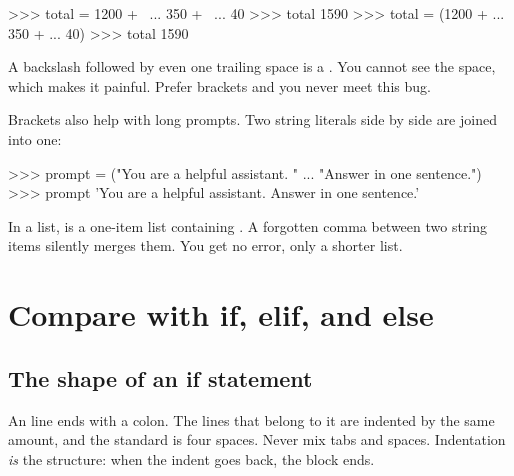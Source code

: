 \begin{pycode}
>>> total = 1200 + \
...         350 + \
...         40
>>> total
1590
>>> total = (1200 +
...          350 +
...          40)
>>> total
1590
\end{pycode}

\begin{trap}
A backslash followed by even one trailing space is a . You cannot see the space, which
makes it painful. Prefer brackets and you never meet this bug.
\end{trap}

Brackets also help with long prompts. Two string literals side by side are joined into one:

\begin{pycode}
>>> prompt = ("You are a helpful assistant. "
...           "Answer in one sentence.")
>>> prompt
'You are a helpful assistant. Answer in one sentence.'
\end{pycode}

\begin{trap}
In a list, \code{["a" "b"]} is a one-item list containing . A forgotten comma between two
string items silently merges them. You get no error, only a shorter list.
\end{trap}

\section{Compare with if, elif, and else}

\subsection{The shape of an if statement}

An  line ends with a colon. The lines that belong to it are indented by the same amount, and
the standard is four spaces. Never mix tabs and spaces. Indentation \emph{is} the structure: when the
indent goes back, the block ends.

